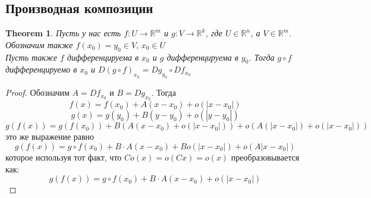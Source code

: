 \documentclass[a4paper,12pt]{article} %
\newtheorem{theorem}{Theorem}
\theoremstyle{definition}
\begin{document}
\subsection{Производная композиции}
\begin{theorem}
	Пусть у нас есть $f : U \rightarrow \mathbb{R}^m$ и $g : V \rightarrow \mathbb{R}^k$, где $U \in \mathbb{R}^n$, а $V \in \mathbb{R}^m$. Обозначим также $f(x_0) = y_0 \in V, \, x_0 \in U$\\
	Пусть также $f$ дифференцируема в $x_0$ и $g$ дифференцируема в $y_0$. Тогда $g \circ f$ дифференцируемо в $x_0$ и $D(g \circ f)_{x_0} = D g_{y_0} \circ D f_{x_0}$
\end{theorem}
\begin{proof}
	Обозначим $A = D f_{x_0}$ и $B = D g_{x_0}$. Тогда
	$$f(x) = f(x_0) + A(x-x_0) + o(|x-x_0|)$$
	$$g(x) = g(y_0) + B(y-y_0) + o(|y-y_0|)$$
	\begin{equation}
		g(f(x)) = g(f(x_0)) + B(A(x-x_0) + o(|x-x_0|)) + o(A(|x-x_0|) + o(|x-x_0|)) 
	\end{equation}
	это же выражение равно
	\begin{equation}
		g(f(x)) = g \circ f (x_0) + B \cdot A (x - x_0) + B o(|x-x_0|) + o(A|x-x_0|) 
	\end{equation}
	которое используя тот факт, что $C o (x) = o(C x) = o (x)$ преобразовывается как:
	\begin{equation}
		g(f(x)) = g \circ f (x_0) + B \cdot A (x - x_0) + o(|x-x_0|)
	\end{equation}
\end{proof}
\end{document}
